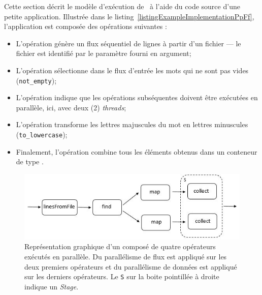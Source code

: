 

Cette section d\'ecrit le mod\`ele d'ex\'ecution de \ppff\ \`a l'aide du code source d'une petite application. Illustr\'ee dans le listing~\ref{listingExampleImplementationPpFf}, l'application est compos\'ee des op\'erations suivantes :
\begin{itemize}
	\item L'op\'eration  g\'en\`ere un flux s\'equentiel de lignes \`a partir d'un fichier --- le fichier est identifi\'e par le param\`etre  fourni en argument;

	\item L'op\'eration  s\'electionne dans le flux d'entr\'ee les mots qui ne sont pas vides (\texttt{not\_empty});

	\item L'op\'eration  indique que les op\'erations subs\'equentes doivent \^etre ex\'ecut\'ees en parall\`ele, ici, avec deux (2) \emph{threads};
	
	\item L'op\'eration  transforme les lettres majuscules du mot en lettres minuscules (\texttt{to\_lowercase});
	
	\item Finalement, l'op\'eration  combine tous les \'el\'ements obtenus dans un conteneur de type .
\end{itemize}




\begin{figure}[ht]
\centering
     \includegraphics[width=\textwidth]{Figures/ExempleRuntimeExecution.jpg}
      \caption[Repr\'esentation graphique d'un  compos\'e de quatre op\'erateurs.]{Repr\'esentation graphique d'un  compos\'e de quatre op\'erateurs ex\'ecut\'es en parall\`ele. Du parall\'elisme de flux est appliqu\'e sur les deux premiers op\'erateurs et du parall\'elisme de donn\'ees est appliqu\'e sur les derniers op\'erateurs. Le \texttt{S} sur la boite pointill\'ee \`a droite indique un \emph{Stage}.}
       \label{ExempleRuntimeExecution.fig}
\end{figure}

